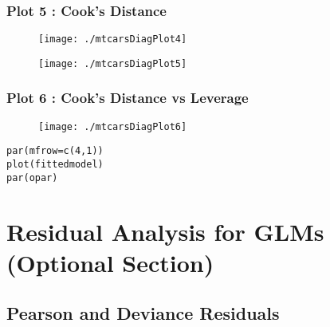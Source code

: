 \documentclass[12pt, a4paper]{article}
\theoremstyle{plain}
\theoremstyle{definition}
\theoremstyle{remark}
\begin{document}
\newpage
\subsubsection{Plot 5 :  Cook's Distance}
\begin{figure}[h!]
\centering
\texttt{[image: ./mtcarsDiagPlot4]}

\label{mtcarsDiagPlot4}
\end{figure}


\begin{figure}[h!]
\centering
\texttt{[image: ./mtcarsDiagPlot5]}

\label{mtcarsDiagPlot5}
\end{figure}


\subsubsection{Plot 6 :  Cook's Distance vs Leverage}
\begin{figure}[h!]
\centering
\texttt{[image: ./mtcarsDiagPlot6]}

\label{mtcarsDiagPlot6}
\end{figure}


\begin{framed}
\begin{verbatim}
par(mfrow=c(4,1))
plot(fittedmodel)
par(opar)
\end{verbatim}
\end{framed}


\newpage







\newpage
\section{Residual Analysis for GLMs (Optional Section)}





\subsection{Pearson and Deviance Residuals} 
\end{document}
